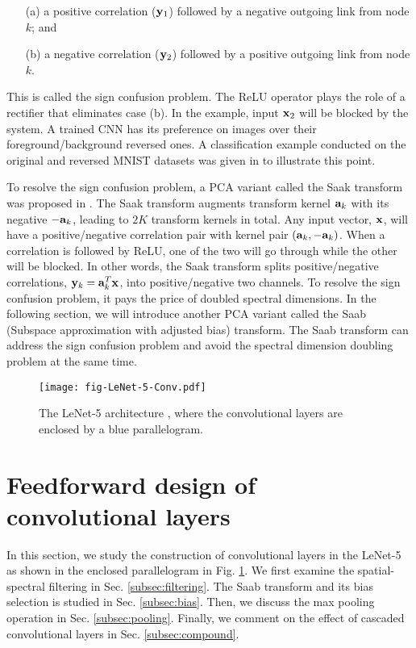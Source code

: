 \documentclass[preprint,12pt]{elsarticle}
\begin{document}
\begin{itemize}
\setlength{\itemsep}{-2pt}
\item[(a)] a positive correlation (${\bf y}_1$) followed by a negative
outgoing link from node $k$; and
\item[(b)] a negative correlation (${\bf y}_2$) followed by a positive
outgoing link from node $k$. 
\end{itemize}
This is called the sign confusion problem.  The ReLU operator plays the
role of a rectifier that eliminates case (b). In the example, input
${\bf x}_2$ will be blocked by the system. A trained CNN has its
preference on images over their foreground/background reversed ones.  A
classification example conducted on the original and reversed MNIST
datasets was given in \cite{kuo2016understanding} to illustrate this
point. 

To resolve the sign confusion problem, a PCA variant called the Saak
transform was proposed in \cite{kuo2018data}. The Saak transform
augments transform kernel ${\bf a}_k$ with its negative $-{\bf a}_k$,
leading to $2K$ transform kernels in total. Any input vector, ${\bf x}$,
will have a positive/negative correlation pair with kernel pair $({\bf
a}_k,-{\bf a}_k)$. When a correlation is followed by ReLU, one of the
two will go through while the other will be blocked. In other words, the
Saak transform splits positive/negative correlations, ${\bf y}_k={\bf
a}_k^T {\bf x}$, into positive/negative two channels.  To resolve the
sign confusion problem, it pays the price of doubled spectral
dimensions. In the following section, we will introduce another PCA
variant called the Saab (Subspace approximation with adjusted bias)
transform. The Saab transform can address the sign confusion problem and
avoid the spectral dimension doubling problem at the same time. 

\begin{figure}[htb]
\centering
\texttt{[image: fig-LeNet-5-Conv.pdf]}
\caption{The LeNet-5 architecture \cite{LeNet1998}, where the
convolutional layers are enclosed by a blue parallelogram.}
\label{fig:LeNet-5-Conv}
\end{figure}

\section{Feedforward design of convolutional layers}\label{sec:Saab}

In this section, we study the construction of convolutional layers in
the LeNet-5 as shown in the enclosed parallelogram in Fig.
\ref{fig:LeNet-5-Conv}. We first examine the spatial-spectral filtering
in Sec. \ref{subsec:filtering}. The Saab transform and its bias
selection is studied in Sec. \ref{subsec:bias}. Then, we discuss the max
pooling operation in Sec. \ref{subsec:pooling}.  Finally, we comment on
the effect of cascaded convolutional layers in Sec.
\ref{subsec:compound}. 
\end{document}
